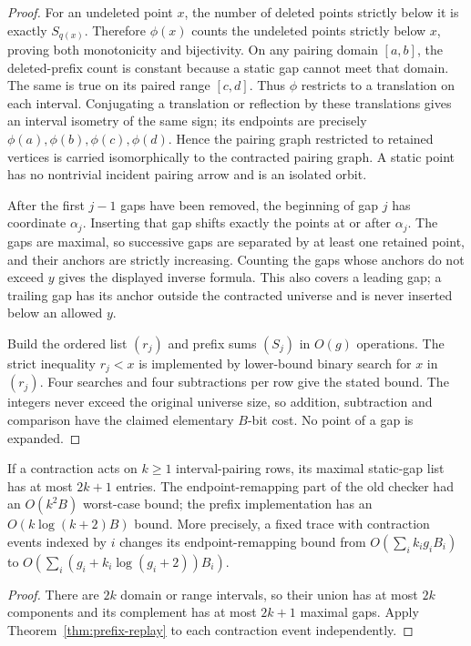 \begin{proof}
For an undeleted point $x$, the number of deleted points strictly below it
is exactly $S_{q(x)}$.  Therefore $\phi(x)$ counts the undeleted points
strictly below $x$, proving both monotonicity and bijectivity.  On any pairing
domain $[a,b]$, the deleted-prefix count is constant because a static gap
cannot meet that domain.  The same is true on its paired range $[c,d]$.
Thus $\phi$ restricts to a translation on each interval.  Conjugating a
translation or reflection by these translations gives an interval isometry
of the same sign; its endpoints are precisely $\phi(a),\phi(b),\phi(c),\phi(d)$.
Hence the pairing graph restricted to retained vertices is carried
isomorphically to the contracted pairing graph.  A static point has no
nontrivial incident pairing arrow and is an isolated orbit.

After the first $j-1$ gaps have been removed, the beginning of gap $j$ has
coordinate $\alpha_j$.  Inserting that gap shifts exactly the points at or
after $\alpha_j$.  The gaps are maximal, so successive gaps are separated by
at least one retained point, and their anchors are strictly increasing.
Counting the gaps whose anchors do not exceed $y$ gives the displayed
inverse formula.  This also covers a leading gap; a trailing gap has its
anchor outside the contracted universe and is never inserted below an
allowed $y$.

Build the ordered list $(r_j)$ and prefix sums $(S_j)$ in $O(g)$ operations.
The strict inequality $r_j<x$ is implemented by lower-bound binary search
for $x$ in $(r_j)$.  Four searches and four subtractions per row give the
stated bound.  The integers never exceed the original universe size, so
addition, subtraction and comparison have the claimed elementary $B$-bit
cost.  No point of a gap is expanded.
\end{proof}

\begin{corollary}
If a contraction acts on $k\ge1$ interval-pairing rows, its maximal static-gap
list has at most $2k+1$ entries.  The endpoint-remapping part of the old
checker had an $O(k^2B)$ worst-case bound; the prefix implementation has an
$O(k\log(k+2)B)$ bound.  More precisely, a fixed trace with contraction events
indexed by $i$ changes its endpoint-remapping bound from
$O(\sum_i k_i g_i B_i)$ to
$O(\sum_i(g_i+k_i\log(g_i+2))B_i)$.
\end{corollary}

\begin{proof}
There are $2k$ domain or range intervals, so their union has at most $2k$
components and its complement has at most $2k+1$ maximal gaps.  Apply
Theorem~\ref{thm:prefix-replay} to each contraction event independently.
\end{proof}

